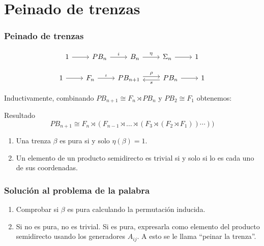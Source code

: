 \documentclass{beamer}
\theoremstyle{definition}
\begin{document}
\section{Peinado de trenzas}
\begin{frame}[fragile]
\frametitle{Peinado de trenzas}
\[
\begin{tikzcd}
1\arrow[r]& PB_n\arrow[r, "i"] & B_n\arrow[r,"\eta"]& \Sigma_n\arrow[r] & 1
\end{tikzcd}
\]

\[
\begin{tikzcd}
1\arrow[r]& F_n\arrow[r, "\iota"] & PB_{n+1}\arrow[r,"\rho", shift left]& \arrow[l,"s",shift left]PB_n\arrow[r] & 1
\end{tikzcd}
\]
\end{frame}

\begin{frame}
Inductivamente, combinando $PB_{n+1}\cong F_n\rtimes PB_n$ y $PB_2\cong F_1$ obtenemos:

\begin{block}{Resultado}
$$PB_{n+1}\cong F_n\rtimes (F_{n-1} \rtimes\dots\rtimes (F_3\rtimes (F_2\rtimes F_1))\cdots))$$
\end{block}

\begin{enumerate}
\item<1-> Una trenza $\beta$ es pura si y solo $\eta(\beta)=1$.
\item<2-> Un elemento de un producto semidirecto es trivial si y solo si lo es cada uno de sus coordenadas.
\end{enumerate}
\end{frame}

\begin{frame}
\frametitle{Solución al problema de la palabra}
\begin{enumerate}
\item<1-> Comprobar si $\beta$ es pura calculando la permutación inducida.
\item<2-> Si no es pura, no es trivial. Si es pura, expresarla como elemento del producto semidirecto usando los generadores $A_{ij}$. A esto se le llama ``peinar la trenza''.
\end{enumerate}

\end{frame}
\end{document}
